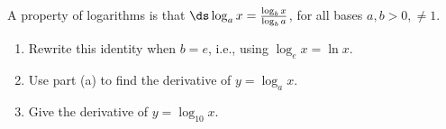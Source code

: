 {A property of logarithms is that $\ds \log_a x = \frac{\log_b x}{\log_b a}$, for all bases $a,b>0,\neq 1$.
\begin{enumerate}
	\item Rewrite this identity when $b=e$, i.e., using $\log_ex =\ln x$.
	\item	Use part (a) to find the derivative of $y=\log_a x$. 
	\item	Give the derivative of $y=\log_{10} x$.
	\enlargethispage{1\baselineskip}
\end{enumerate}
}
{
}
